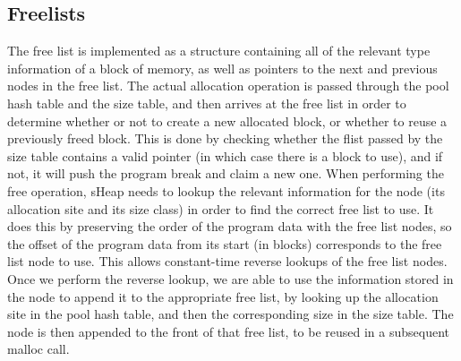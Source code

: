 \documentclass[conference]{IEEEtran}
\begin{document}
\subsection{Freelists}
The free list is implemented as a structure containing all of the relevant type 
information of a block of memory, as well as pointers to the next and previous nodes in the free list. 
The actual allocation operation is passed through the pool hash table and the size 
table, and then arrives at the free list in order to determine whether or not to 
create a new allocated block, or whether to reuse a previously freed block. This 
is done by checking whether the flist passed by the size table contains a valid 
pointer (in which case there is a block to use), and if not, it will push the 
program break and claim a new one. When performing the free operation, sHeap needs 
to lookup the relevant information for the node (its allocation site and its size 
class) in order to find the correct free list to use. It does this by preserving 
the order of the program data with the free list nodes, so the offset of the 
program data from its start (in blocks) corresponds to the free list node to use. 
This allows constant-time reverse lookups of the free list nodes. Once we perform 
the reverse lookup, we are able to use the information stored in the node to 
append it to the appropriate free list, by looking up the allocation site in the 
pool hash table, and then the corresponding size in the size table. The node is 
then appended to the front of that free list, to be reused in a subsequent malloc 
call.
\end{document}
